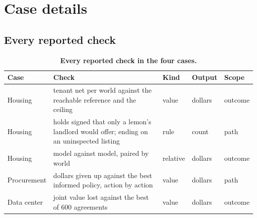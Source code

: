 \section{Case details}\label{case-details}

\subsection{Every reported check}\label{every-reported-check}

\renewcommand{\thetable}{E.1}
\begin{longtable}[]{@{}
  >{\raggedright\arraybackslash}p{}
  >{\raggedright\arraybackslash}p{}
  >{\raggedright\arraybackslash}p{}
  >{\raggedright\arraybackslash}p{}
  >{\raggedright\arraybackslash}p{}@{}}
\caption{\textbf{Every reported check in the four cases.}}\label{tab:E.1}\tabularnewline
\toprule\noalign{}
\begin{minipage}[b]{\linewidth}\raggedright
Case
\end{minipage} & \begin{minipage}[b]{\linewidth}\raggedright
Check
\end{minipage} & \begin{minipage}[b]{\linewidth}\raggedright
Kind
\end{minipage} & \begin{minipage}[b]{\linewidth}\raggedright
Output
\end{minipage} & \begin{minipage}[b]{\linewidth}\raggedright
Scope
\end{minipage} \\
\midrule\noalign{}
\endhead
\bottomrule\noalign{}
\endlastfoot
Housing & tenant net per world against the reachable reference and the ceiling & value & dollars & outcome \\
Housing & holds signed that only a lemon's landlord would offer; ending on an uninspected listing & rule & count & path \\
Housing & model against model, paired by world & relative & dollars & outcome \\
Procurement & dollars given up against the best informed policy, action by action & value & dollars & path \\
Data center & joint value lost against the best of 600 agreements & value & dollars & outcome \\

\end{longtable}
